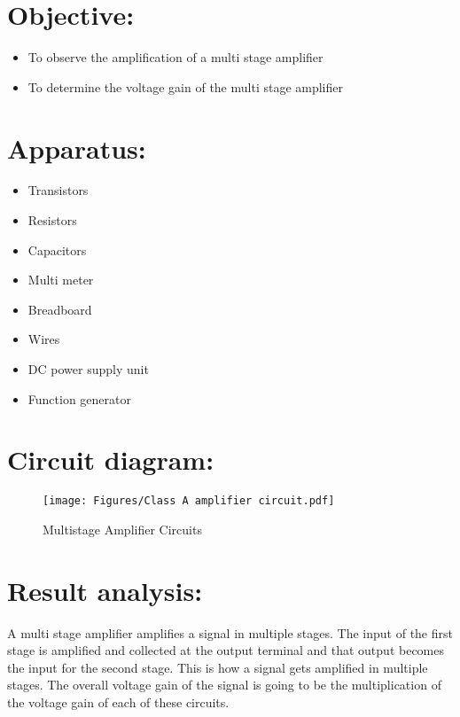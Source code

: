 \documentclass[a4paper, 12pt]{extarticle}
\begin{document}
\section{Objective:}
    \begin{itemize}
        \item To observe the amplification of a multi stage amplifier
\item To determine the voltage gain of the multi stage amplifier
    \end{itemize}

    
\section{Apparatus:}

      \begin{itemize}
        \item Transistors
        \item Resistors
        \item Capacitors
        \item Multi meter
        \item Breadboard
        \item Wires
        \item DC power supply unit
        \item Function generator
      \end{itemize}
    
\section{Circuit diagram:}
    \begin{figure}[!h]
    \centering 
    \texttt{[image: Figures/Class A amplifier circuit.pdf]} 
\caption{Multistage Amplifier Circuits}  
\end{figure} 
\newpage


\restoregeometry
{}
\section{Result analysis:}
A multi stage amplifier amplifies a signal in multiple stages. The input of the first stage is amplified and collected at the output terminal and that output becomes the input for the second stage. This is how a signal gets amplified in multiple stages. The overall voltage gain of the signal is going to be the multiplication of the voltage gain of each of these circuits.
\end{document}
